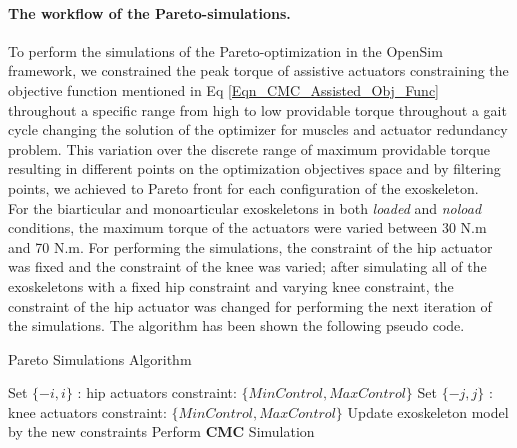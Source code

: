 \documentclass[10pt,letterpaper]{article}
\begin{document}
\paragraph*{The workflow of the Pareto-simulations.} To perform the simulations of the Pareto-optimization in the OpenSim framework, we constrained the peak torque of assistive actuators constraining the objective function mentioned in Eq \eqref{Eqn_CMC_Assisted_Obj_Func} throughout a specific range from high to low providable torque throughout a gait cycle changing the solution of the optimizer for muscles and actuator redundancy problem. This variation over the discrete range of maximum providable torque resulting in different points on the optimization objectives space and by filtering points, we achieved to Pareto front for each configuration of the exoskeleton.\\
For the biarticular and monoarticular exoskeletons in both \textit{loaded} and \textit{noload} conditions, the maximum torque of the actuators were varied between 30 N.m and 70 N.m. For performing the simulations, the constraint of the hip actuator was fixed and the constraint of the knee was varied; after simulating all of the exoskeletons with a fixed hip constraint and varying knee constraint, the constraint of the hip actuator was changed for performing the next iteration of the simulations. The algorithm has been shown the following pseudo code.\\

\begin{algorithm}\label{Algorithm_Pareto_simulation}
	\caption{Pareto Simulations Algorithm}\label{Pareto_Algorithm}
	\begin{algorithmic}[1]
		\State Set $\{-i,i\}$ : hip actuators constraint: $\{Min Control, Max Control\}$
		\State Set $\{-j,j\}$ : knee actuators constraint: $\{Min Control, Max Control\}$
		\State Update exoskeleton model by the new constraints
		\State Perform \textbf{CMC} Simulation
		\EndFor
		\EndFor
	\end{algorithmic}
\end{algorithm}

\end{document}
